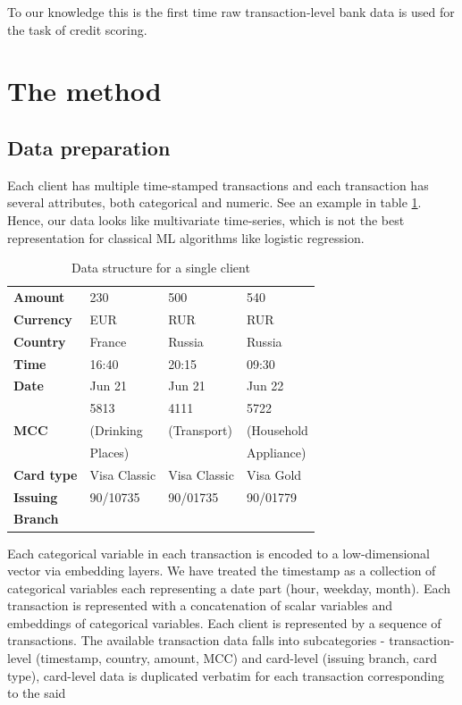 \documentclass{sigkddExp}
\begin{document}
To our knowledge this is the first time raw transaction-level bank data is used for the task of credit scoring. 

\section{The method}
\subsection{Data preparation}


Each client has multiple time-stamped transactions and each transaction has several attributes, both categorical and numeric. See an example in table \ref{tab1}. Hence, our data looks like multivariate time-series, which is not the best representation for classical ML algorithms like logistic regression.

\begin{table}
\caption{Data structure for a single client}
\begin{tabular}{ | l |  l l l | }
\hline
\textbf{Amount} & 230 & 500 & 540 \\
\textbf{Currency} & EUR & RUR & RUR \\
\textbf{Country} & France & Russia & Russia \\
\textbf{Time} & 16:40 & 20:15 & 09:30 \\
\textbf{Date} & Jun 21 & Jun 21 & Jun 22 \\
 & 5813 & 4111 & 5722 \\
\textbf{MCC} & (Drinking & (Transport) & (Household \\
 & Places) &  & Appliance) \\
\textbf{Card type} & Visa Classic & Visa Classic & Visa Gold \\
\textbf{Issuing} & 90/10735 & 90/01735 & 90/01779 \\
\textbf{Branch} &&& \\
\hline
\end{tabular}
\label{tab1}
\end{table}

Each categorical variable in each transaction is encoded to a low-dimensional vector via embedding layers. We have treated the timestamp as a collection of categorical variables each representing a date part (hour, weekday, month). Each transaction is represented with a concatenation of scalar variables and embeddings of categorical variables. Each client is represented by a sequence of transactions.
The available transaction data falls into subcategories - transaction-level (timestamp, country, amount, MCC) and card-level (issuing branch, card type), card-level data is duplicated verbatim for each transaction corresponding to the said 
\end{document}

